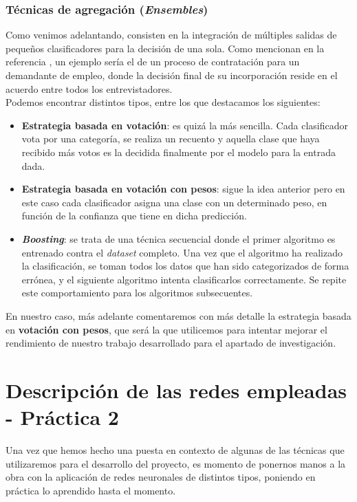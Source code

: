 \documentclass[]{article}
\begin{document}
		\subsubsection{Técnicas de agregación (\textit{Ensembles})}
		
			Como venimos adelantando, consisten en la integración de múltiples salidas de pequeños clasificadores para la decisión de una sola. Como mencionan en la referencia \cite{ensembling-methods}, un ejemplo sería el de un proceso de contratación para un demandante de empleo, donde la decisión final de su incorporación reside en el acuerdo entre todos los entrevistadores.\\
			
			Podemos encontrar distintos tipos, entre los que destacamos los siguientes:
			
			\begin{itemize}
				\item \textbf{Estrategia basada en votación}: es quizá la más sencilla. Cada clasificador vota por una categoría, se realiza un recuento y aquella clase que haya recibido más votos es la decidida finalmente por el modelo para la entrada dada.
				\item \textbf{Estrategia basada en votación con pesos}: sigue la idea anterior pero en este caso cada clasificador asigna una clase con un determinado peso, en función de la confianza que tiene en dicha predicción.
				\item \textbf{\textit{Boosting}}: se trata de una técnica secuencial donde el primer algoritmo es entrenado contra el \textit{dataset} completo. Una vez que el algoritmo ha realizado la clasificación, se toman todos los datos que han sido categorizados de forma errónea, y el siguiente algoritmo intenta clasificarlos correctamente. Se repite este comportamiento para los algoritmos subsecuentes.
			\end{itemize}
		
			En nuestro caso, más adelante comentaremos con más detalle la estrategia basada en \textbf{votación con pesos}, que será la que utilicemos para intentar mejorar el rendimiento de nuestro trabajo desarrollado para el apartado de investigación.
		
\section{Descripción de las redes empleadas - Práctica 2}

	Una vez que hemos hecho una puesta en contexto de algunas de las técnicas que utilizaremos para el desarrollo del proyecto, es momento de ponernos manos a la obra con la aplicación de redes neuronales de distintos tipos, poniendo en práctica lo aprendido hasta el momento.\\
	
\end{document}
